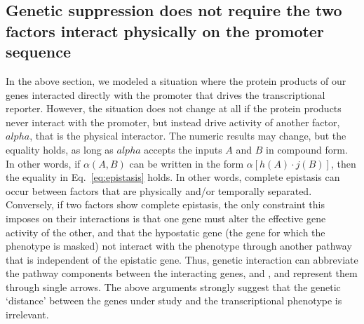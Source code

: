 \subsection*{Genetic suppression does not require the two factors interact
             physically on the promoter sequence}
In the above section, we modeled a situation where the protein products of
our genes interacted directly with the promoter that drives the transcriptional
reporter. However, the situation does not change at all if the protein products
never interact with the promoter, but instead drive activity of another factor,
\(alpha\), that is the physical interactor. The numeric results may change, but
the equality holds, as long as \(alpha\) accepts the inputs \(A\) and \(B\)
in compound form. In other words, if \(\alpha(A, B)\) can be written in the form
\(\alpha[h(A)\cdot j(B)]\), then the equality in Eq.~\ref{eq:epistasis} holds.
In other words, complete epistasis can occur between factors that are physically
and/or temporally separated. Conversely, if two factors show complete epistasis,
the only constraint this imposes on their interactions is that one gene must
alter the effective gene activity of the other, and that the hypostatic gene
(the gene for which the phenotype is masked) not interact with the phenotype
through another pathway that is independent of the epistatic gene. Thus, genetic
interaction can abbreviate the pathway components between the interacting genes,
 and , and represent them through single arrows. The above
arguments strongly suggest that the genetic `distance' between the genes under
study and the transcriptional phenotype is irrelevant.

